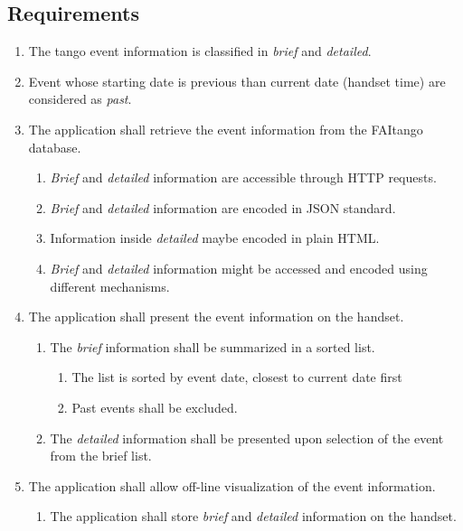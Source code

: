 \documentclass[12pt, twoside]{article}
\begin{document}
\subsection*{Requirements}
\begin{enumerate}
	\item The tango event information is classified 
         		 in \emph{brief} and \emph{detailed}.
	\item Event whose starting date is previous than current date 
          	(handset time) are considered as \emph{past}.
    	\item	The application shall retrieve the event information from the 
          	FAItango database.
    		\begin{enumerate}
        			\item	\emph{Brief} and \emph{detailed} information are accessible through 
              			HTTP requests.
        			\item \emph{Brief} and \emph{detailed} information are encoded in JSON standard.
        			\item Information inside \emph{detailed} maybe encoded in plain HTML.
        			\item \emph{Brief} and \emph{detailed} information might be accessed and encoded using
              			different mechanisms.
    		\end{enumerate}
	\item The application shall present the event information on the handset.
    	\begin{enumerate}
        		\item The \emph{brief} information shall be summarized in a sorted list.
        			\begin{enumerate}
            			\item The list is sorted by event date, closest to current date first
            			\item Past events shall be excluded.
        			\end{enumerate}
        		\item The \emph{detailed} information shall be presented upon selection of
              		the event from the brief list.
    	\end{enumerate}
    	\item The application shall allow off-line visualization of the event information.
    		\begin{enumerate}
        			\item The application shall store \emph{brief} and \emph{detailed} information on the handset.

\end{enumerate}
\end{enumerate}
\end{document}

